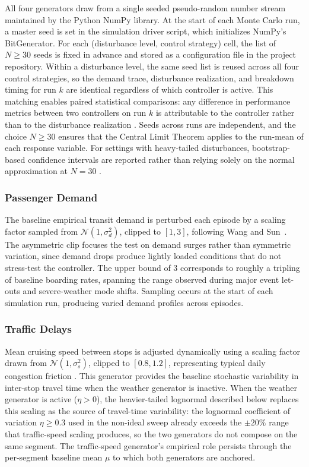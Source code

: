 All four generators draw from a single seeded pseudo-random number stream maintained by the Python NumPy library. At the start of each Monte Carlo run, a master seed is set in the simulation driver script, which initializes NumPy's BitGenerator. For each (disturbance level, control strategy) cell, the list of $N \geq 30$ seeds is fixed in advance and stored as a configuration file in the project repository. Within a disturbance level, the same seed list is reused across all four control strategies, so the demand trace, disturbance realization, and breakdown timing for run $k$ are identical regardless of which controller is active. This matching enables paired statistical comparisons: any difference in performance metrics between two controllers on run $k$ is attributable to the controller rather than to the disturbance realization \cite{Henderson2018Matters}. Seeds across runs are independent, and the choice $N \geq 30$ ensures that the Central Limit Theorem applies to the run-mean of each response variable. For settings with heavy-tailed disturbances, bootstrap-based confidence intervals are reported rather than relying solely on the normal approximation at $N = 30$ \cite{Agarwal2021Precipice}.

\subsubsection{Passenger Demand}

The baseline empirical transit demand is perturbed each episode by a scaling factor sampled from $\mathcal{N}(1, \sigma_d^2)$, clipped to $[1, 3]$, following Wang and Sun~\cite{Wangsun}. The asymmetric clip focuses the test on demand surges rather than symmetric variation, since demand drops produce lightly loaded conditions that do not stress-test the controller. The upper bound of 3 corresponds to roughly a tripling of baseline boarding rates, spanning the range observed during major event let-outs and severe-weather mode shifts. Sampling occurs at the start of each simulation run, producing varied demand profiles across episodes.

\subsubsection{Traffic Delays}

Mean cruising speed between stops is adjusted dynamically using a scaling factor drawn from $\mathcal{N}(1, \sigma_s^2)$, clipped to $[0.8, 1.2]$, representing typical daily congestion friction \cite{Wangsun}. This generator provides the baseline stochastic variability in inter-stop travel time when the weather generator is inactive. When the weather generator is active ($\eta > 0$), the heavier-tailed lognormal described below replaces this scaling as the source of travel-time variability: the lognormal coefficient of variation $\eta \geq 0.3$ used in the non-ideal sweep already exceeds the $\pm 20\%$ range that traffic-speed scaling produces, so the two generators do not compose on the same segment. The traffic-speed generator's empirical role persists through the per-segment baseline mean $\mu$ to which both generators are anchored.

